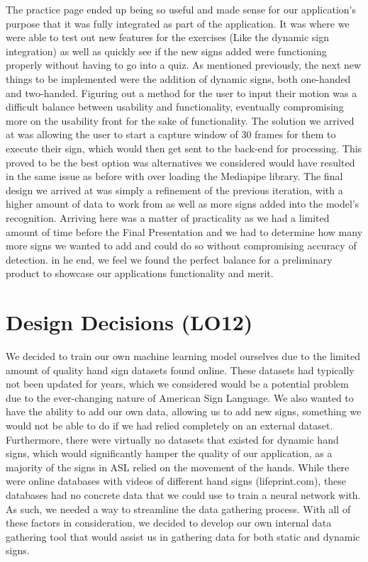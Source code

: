 \documentclass{article}
\begin{document}
The practice page ended up being so useful and made sense for our application's purpose that it was fully integrated as part of the application. It was where we were able to test out new features for the exercises (Like the dynamic sign integration) as well as quickly see if the new signs added were functioning properly without having to go into a quiz. As mentioned previously, the next new things to be implemented were the addition of dynamic signs, both one-handed and two-handed. Figuring out a method for the user to input their motion was a difficult balance between usability and functionality, eventually compromising more on the usability front for the sake of functionality. The solution we arrived at was allowing the user to start a capture window of 30 frames for them to execute their sign, which would then get sent to the back-end for processing. This proved to be the best option was alternatives we considered would have resulted in the same issue as before with over loading the Mediapipe library.
\newpage
The final design we arrived at was simply a refinement of the previous iteration, with a higher amount of data to work from as well as more signs added into the model's recognition. Arriving here was a matter of practicality as we had a limited amount of time before the Final Presentation and we had to determine how many more signs we wanted to add and could do so without compromising accuracy of detection. in he end, we feel we found the perfect balance for a preliminary product to showcase our applications functionality and merit.


\section{Design Decisions (LO12)}


We decided to train our own machine learning model ourselves due to the limited amount of quality hand sign datasets found online. These datasets had typically not been updated for years, which we considered would be a potential problem due to the ever-changing nature of American Sign Language. We also wanted to have the ability to add our own data, allowing us to add new signs, something we would not be able to do if we had relied completely on an external dataset. Furthermore, there were virtually no datasets that existed for dynamic hand signs, which would significantly hamper the quality of our application, as a majority of the signs in ASL relied on the movement of the hands. While there were online databases with videos of different hand signs (lifeprint.com), these databases had no concrete data that we could use to train a neural network with. As such, we needed a way to streamline the data gathering process. With all of these factors in consideration, we decided to develop our own internal data gathering tool that would assist us in gathering data for both static and dynamic signs. 
\end{document}

